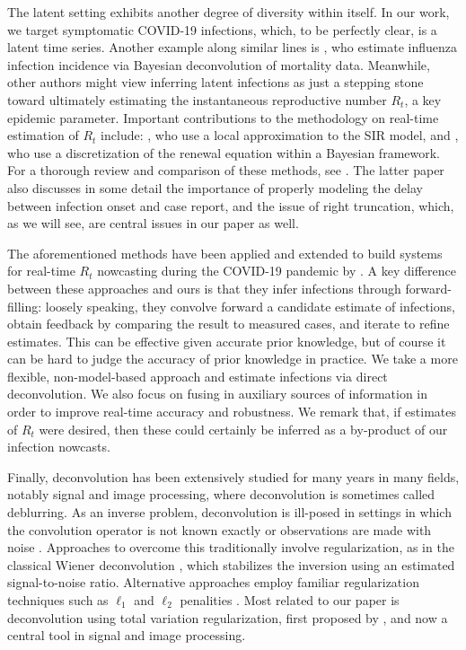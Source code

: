 \documentclass[sts]{imsart}
\theoremstyle{plain}
\theoremstyle{definition}
\theoremstyle{remark}
\begin{document}
The latent setting exhibits another degree of diversity within itself. In our
work, we target symptomatic COVID-19 infections, which, to be perfectly clear,
is a latent time series. Another example along similar lines is
\citet{Goldstein:2009}, who estimate influenza infection incidence via Bayesian
deconvolution of mortality data. Meanwhile, other authors might view inferring 
latent infections as just a stepping stone toward ultimately estimating the 
instantaneous reproductive number $R_t$, a key epidemic parameter. Important 
contributions to the methodology on real-time estimation of $R_t$ include: 
\citet{Bettencourt:2008}, who use a local approximation to the SIR model, and 
\citet{Cori:2013, Thompson:2019}, who use a discretization of the renewal
equation within a Bayesian framework. For a thorough review and comparison of
these methods, see \citet{Gostic:2020}. The latter paper also discusses in some
detail the importance of properly modeling the delay between infection onset and
case report, and the issue of right truncation, which, as we will see, are
central issues in our paper as well. 

The aforementioned methods have been applied and extended to build systems for
real-time $R_t$ nowcasting during the COVID-19 pandemic by \citet{Abbott:2020,
  rtlive, Chitwood:2021}. A key difference between these approaches and ours is 
that they infer infections through forward-filling: loosely speaking, they
convolve forward a candidate estimate of infections, obtain feedback by
comparing the result to measured cases, and iterate to refine estimates. This
can be effective given accurate prior knowledge, but of course it can be hard to
judge the accuracy of prior knowledge in practice. We take a more flexible,
non-model-based approach and estimate infections via direct deconvolution. We
also focus on fusing in auxiliary sources of information in order to improve
real-time accuracy and robustness. We remark that, if estimates of $R_t$ were
desired, then these could certainly be inferred as a by-product of our infection
nowcasts.

Finally, deconvolution has been extensively studied for many years in many
fields, notably signal and image processing, where deconvolution is sometimes
called deblurring. As an inverse problem, deconvolution is ill-posed in settings
in which the convolution operator is not known exactly or observations are made
with noise \citep{Oppenheim:2017}. Approaches to overcome this traditionally
involve regularization, as in the classical Wiener deconvolution
\citep{Wiener:1964}, which stabilizes the inversion using an estimated
signal-to-noise ratio. Alternative approaches employ familiar regularization
techniques such as $\ell_1$ and $\ell_2$ penalities \citep{Taylor:1979,
  Debeye:1990}. Most related to our paper is deconvolution using total variation 
regularization, first proposed by \citet{Rudin:1994}, and now a central tool in
signal and image processing.
\end{document}
